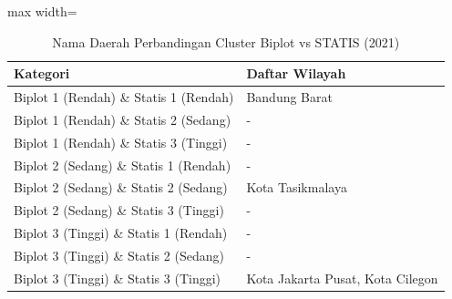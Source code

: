 \begin{table}[H]
\centering
\caption{Nama Daerah Perbandingan Cluster Biplot vs STATIS (2021)} \label{tab:samplebiplot_statis_comp_name_2021}
\begin{adjustbox}{max width=\textwidth}
\begin{tabular}{|p{4cm}|p{10cm}|}
\hline
\textbf{Kategori} & \textbf{Daftar Wilayah} \\
\hline
Biplot 1 (Rendah) \& Statis 1 (Rendah) & Bandung Barat \\
\hline
Biplot 1 (Rendah) \& Statis 2 (Sedang) & - \\
\hline
Biplot 1 (Rendah) \& Statis 3 (Tinggi) & - \\
\hline
Biplot 2 (Sedang) \& Statis 1 (Rendah) & - \\
\hline
Biplot 2 (Sedang) \& Statis 2 (Sedang) & Kota Tasikmalaya \\
\hline
Biplot 2 (Sedang) \& Statis 3 (Tinggi) & - \\
\hline
Biplot 3 (Tinggi) \& Statis 1 (Rendah) & - \\
\hline
Biplot 3 (Tinggi) \& Statis 2 (Sedang) & - \\
\hline
Biplot 3 (Tinggi) \& Statis 3 (Tinggi) & Kota Jakarta Pusat, Kota Cilegon \\
\hline
\end{tabular}
\end{adjustbox}
\end{table}